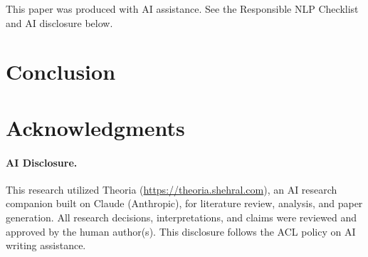 \documentclass[11pt]{article}
\begin{document}

This paper was produced with AI assistance. See the Responsible NLP Checklist and AI disclosure below.

\section{Conclusion}
\label{sec:conclusion}


\section*{Acknowledgments}


\paragraph{AI Disclosure.}
This research utilized Theoria (\url{https://theoria.shehral.com}), an AI research companion built on Claude (Anthropic), for literature review, analysis, and paper generation. All research decisions, interpretations, and claims were reviewed and approved by the human author(s). This disclosure follows the ACL policy on AI writing assistance.



\end{document}
